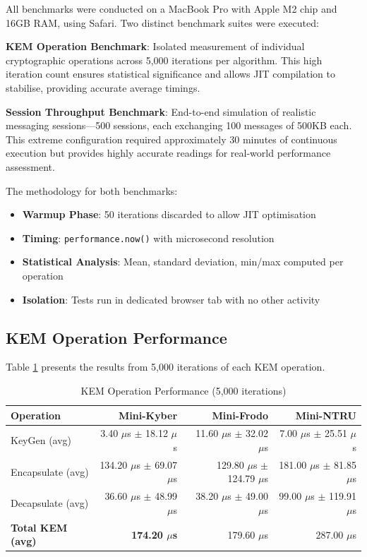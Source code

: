 \documentclass[11pt,a4paper]{article}
\begin{document}
All benchmarks were conducted on a MacBook Pro with Apple M2 chip and 16GB RAM, using Safari. Two distinct benchmark suites were executed:

\textbf{KEM Operation Benchmark}: Isolated measurement of individual cryptographic operations across 5,000 iterations per algorithm. This high iteration count ensures statistical significance and allows JIT compilation to stabilise, providing accurate average timings.

\textbf{Session Throughput Benchmark}: End-to-end simulation of realistic messaging sessions---500 sessions, each exchanging 100 messages of 500KB each. This extreme configuration required approximately 30 minutes of continuous execution but provides highly accurate readings for real-world performance assessment.

The methodology for both benchmarks:
\begin{itemize}
    \item \textbf{Warmup Phase}: 50 iterations discarded to allow JIT optimisation
    \item \textbf{Timing}: \texttt{performance.now()} with microsecond resolution
    \item \textbf{Statistical Analysis}: Mean, standard deviation, min/max computed per operation
    \item \textbf{Isolation}: Tests run in dedicated browser tab with no other activity
\end{itemize}

\subsection{KEM Operation Performance}

Table \ref{tab:kem-results} presents the results from 5,000 iterations of each KEM operation.

\begin{table}[H]
\centering
\caption{KEM Operation Performance (5,000 iterations)}
\label{tab:kem-results}
\begin{tabular}{l|r|r|r}
\toprule
\textbf{Operation} & \textbf{Mini-Kyber} & \textbf{Mini-Frodo} & \textbf{Mini-NTRU} \\
\midrule
KeyGen (avg) & 3.40 $\mu$s $\pm$ 18.12 $\mu$s & 11.60 $\mu$s $\pm$ 32.02 $\mu$s & 7.00 $\mu$s $\pm$ 25.51 $\mu$s \\
Encapsulate (avg) & 134.20 $\mu$s $\pm$ 69.07 $\mu$s & 129.80 $\mu$s $\pm$ 124.79 $\mu$s & 181.00 $\mu$s $\pm$ 81.85 $\mu$s \\
Decapsulate (avg) & 36.60 $\mu$s $\pm$ 48.99 $\mu$s & 38.20 $\mu$s $\pm$ 49.00 $\mu$s & 99.00 $\mu$s $\pm$ 119.91 $\mu$s \\
\midrule
\textbf{Total KEM (avg)} & \textbf{174.20 $\mu$s} & 179.60 $\mu$s & 287.00 $\mu$s \\
\bottomrule
\end{tabular}
\end{table}
\end{document}
